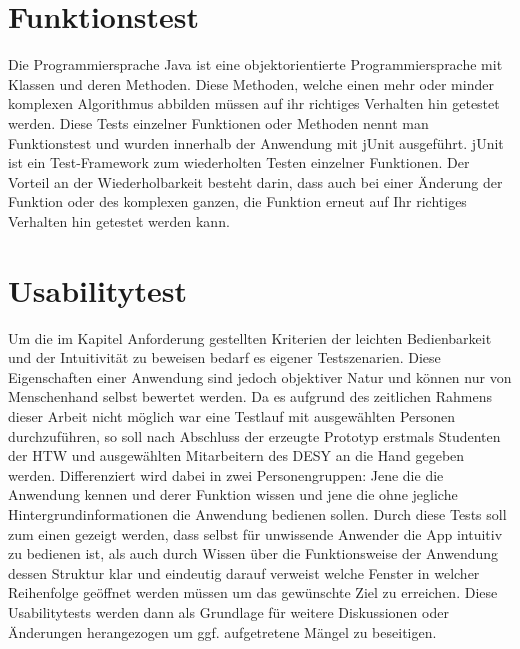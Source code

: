 \documentclass[10pt, a4paper,headsepline]{scrreprt}
\begin{document}
\section{Funktionstest}
Die Programmiersprache Java ist eine objektorientierte Programmiersprache mit Klassen und deren Methoden. Diese Methoden, welche einen mehr oder minder komplexen Algorithmus abbilden müssen auf ihr richtiges Verhalten hin getestet werden. Diese Tests einzelner Funktionen oder Methoden nennt man Funktionstest und wurden innerhalb der Anwendung mit jUnit ausgeführt. jUnit ist ein Test-Framework zum wiederholten Testen einzelner Funktionen. Der Vorteil an der Wiederholbarkeit besteht darin, dass auch bei einer Änderung der Funktion oder des komplexen ganzen, die Funktion erneut auf Ihr richtiges Verhalten hin getestet werden kann.   


\section{Usabilitytest}
Um die im Kapitel Anforderung gestellten Kriterien der leichten Bedienbarkeit und der Intuitivität zu beweisen bedarf es eigener Testszenarien. Diese Eigenschaften einer Anwendung sind jedoch objektiver Natur und können nur von Menschenhand selbst bewertet werden. Da es aufgrund des zeitlichen Rahmens dieser Arbeit nicht möglich war eine Testlauf mit ausgewählten Personen durchzuführen, so soll nach Abschluss der erzeugte Prototyp erstmals Studenten der HTW und ausgewählten Mitarbeitern des DESY an die Hand gegeben werden. Differenziert wird dabei in zwei Personengruppen: Jene die die Anwendung kennen und derer Funktion wissen und jene die ohne jegliche Hintergrundinformationen die Anwendung bedienen sollen. Durch diese Tests soll zum einen gezeigt werden, dass  selbst für unwissende Anwender die App intuitiv zu bedienen ist, als auch durch Wissen über die Funktionsweise der Anwendung dessen Struktur klar und eindeutig darauf verweist welche Fenster in welcher Reihenfolge geöffnet werden müssen um das gewünschte Ziel zu erreichen. Diese Usabilitytests werden dann als Grundlage für weitere Diskussionen oder Änderungen herangezogen um ggf. aufgetretene Mängel zu beseitigen.


\end{document}
